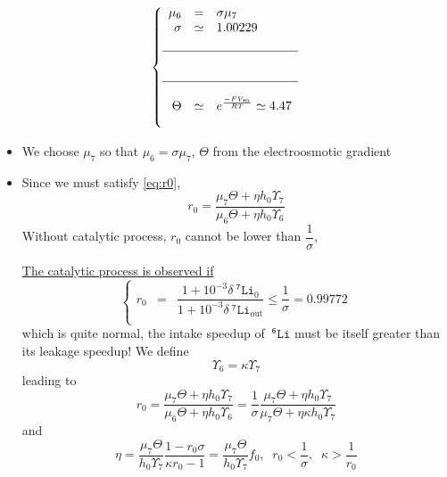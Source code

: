 \documentclass[aps,onecolumn,10pt]{revtex4}
\newcommand{\mychem}[1]{\mathtt{#1}}
\newcommand{\spLi}[1]{{~^{\mychem{#1}}\mychem{Li}}}
\newcommand{\deltaLi}{ {\delta\!\!\!\spLi{7}} }
\newcommand{\deltaLiOut}{{\deltaLi}_{\mathrm{out}}}
\begin{document}
\begin{equation}
\left\lbrace
\begin{array}{rcl}
		\mu_6     & = & \sigma \mu_7\\
		\sigma    & \simeq & 1.00229 \\
		\\
		\hline
		\\
		\\
		\hline
		\\
		\Theta     & \simeq  & e^{\frac{-F V_m}{RT} } \simeq 4.47\\
		\\
\end{array}
\right.
\end{equation}

\begin{itemize}
\item We choose $\mu_7$ so that $\mu_6=\sigma\mu_7$, $\Theta$ from the electroosmotic gradient
\item Since we must satisfy \eqref{eq:r0},
\begin{equation}
	r_0 = \dfrac{\mu_7\Theta+\eta h_0 \Upsilon_7}{\mu_6\Theta+\eta h_0 \Upsilon_6}
\end{equation}
Without catalytic process, $r_0$ cannot be lower than $\dfrac{1}{\sigma}$,

\underline{The catalytic process is observed if}
\begin{equation}
\boxed{
\left\lbrace
\begin{array}{rcl}
	r_0 & = & \dfrac{1+10^{-3}\deltaLi_0}{1+10^{-3}\deltaLiOut} \leq \dfrac{1}{\sigma} = 0.99772\\
\end{array}
\right.
}
\end{equation}
which is quite normal, the intake speedup of $\spLi{6}$ must be itself greater than its leakage speedup!
We define
\begin{equation}
	\Upsilon_6  = \kappa \Upsilon_7
\end{equation}
leading to
\begin{equation}
	r_0 =  \dfrac{\mu_7\Theta+\eta h_0 \Upsilon_7}{\mu_6\Theta+\eta h_0 \Upsilon_6} = \dfrac{1}{\sigma} \dfrac{\mu_7\Theta+\eta h_0 \Upsilon_7}{\mu_7\Theta+\eta \kappa h_0 \Upsilon_7}
\end{equation}
and
\begin{equation}
	\boxed{
	\eta = \dfrac{\mu_7\Theta}{h_0\Upsilon_7} \dfrac{1-r_0\sigma}{\kappa r_0-1} = \dfrac{\mu_7\Theta}{h_0\Upsilon_7} f_0
	,\;\; r_0 < \frac{1}{\sigma}, \;\; \kappa > \frac{1}{r_0}
	}
\end{equation}


\end{itemize}
\end{document}
